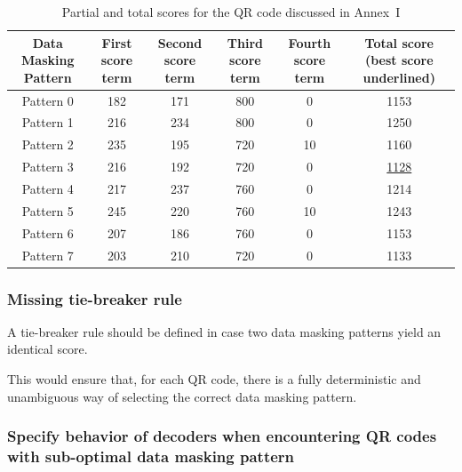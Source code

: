 \documentclass[a4paper,twoside]{article}
\newcommand{\best}[1]{\underline{#1}}
\begin{document}
\begin{table}[h]
\centering
\tiny
\begin{tabular}{|c|c|c|c|c|c|}
\hline
Data Masking Pattern & First score term & Second score term & Third score term & Fourth score term & Total score (best score underlined) \\
\hline
Pattern 0            & 182              & 171               & 800              &  0                & 1153        \\
Pattern 1            & 216              & 234               & 800              &  0                & 1250        \\
Pattern 2            & 235              & 195               & 720              & 10                & 1160        \\
Pattern 3            & 216              & 192               & 720              &  0                & \best{1128} \\
Pattern 4            & 217              & 237               & 760              &  0                & 1214        \\
Pattern 5            & 245              & 220               & 760              & 10                & 1243        \\
Pattern 6            & 207              & 186               & 760              &  0                & 1153        \\
Pattern 7            & 203              & 210               & 720              &  0                & 1133        \\
\hline
\end{tabular}
\caption{Partial and total scores for the QR code discussed in Annex~I}
\end{table}

\subsubsection*{Missing tie-breaker rule}

A tie-breaker rule should be defined in case two data masking patterns yield an identical score.

This would ensure that, for each QR code, there is a fully deterministic and unambiguous way of selecting the
correct data masking pattern.

\subsubsection*{Specify behavior of decoders when encountering QR codes with sub-optimal data masking pattern}
\end{document}
